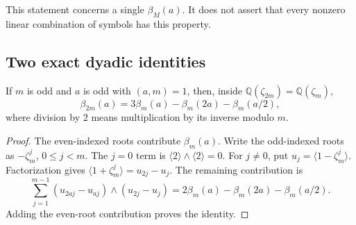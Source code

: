 This statement concerns a single $\beta_M(a)$. It does not assert
that every nonzero linear combination of symbols has this property.

\subsection{Two exact dyadic identities}

\begin{lemma}\label{jnew:lem:odd-double}
If $m$ is odd and $a$ is odd with $(a,m)=1$, then, inside
$\mathbb Q(\zeta_{2m})=\mathbb Q(\zeta_m)$,
\begin{equation}\label{jnew:eq:odd-double}
 \beta_{2m}(a)=3\beta_m(a)-\beta_m(2a)-\beta_m(a/2),
\end{equation}
where division by $2$ means multiplication by its inverse modulo $m$.
\end{lemma}
\begin{proof}
The even-indexed roots contribute $\beta_m(a)$. Write the odd-indexed
roots as $-\zeta_m^j$, $0\le j<m$. The $j=0$ term is
$\langle2\rangle\wedge\langle2\rangle=0$.
For $j\ne0$, put $u_j=\langle1-\zeta_m^j\rangle$. Factorization gives
$\langle1+\zeta_m^j\rangle=u_{2j}-u_j$. The remaining contribution is
\[
 \sum_{j=1}^{m-1}(u_{2aj}-u_{aj})\wedge(u_{2j}-u_j)
 =2\beta_m(a)-\beta_m(2a)-\beta_m(a/2).
\]
Adding the even-root contribution proves the identity.
\end{proof}


